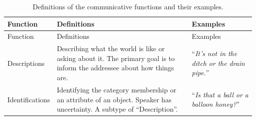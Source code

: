 \documentclass[oneside]{report}
\theoremstyle{definition}
\theoremstyle{definition}
\theoremstyle{definition}
\theoremstyle{remark}
\begin{document}
\begin{longtable}[]{@{}lll@{}}
\caption{\label{tab:speechActs} Definitions of the communicative functions
and their examples.}\tabularnewline
\toprule
\begin{minipage}[b]{0.14\columnwidth}\raggedright\strut
Function\strut
\end{minipage} & \begin{minipage}[b]{0.44\columnwidth}\raggedright\strut
Definitions\strut
\end{minipage} & \begin{minipage}[b]{0.33\columnwidth}\raggedright\strut
Examples\strut
\end{minipage}\tabularnewline
\midrule
\endfirsthead
\toprule
\begin{minipage}[b]{0.14\columnwidth}\raggedright\strut
Function\strut
\end{minipage} & \begin{minipage}[b]{0.44\columnwidth}\raggedright\strut
Definitions\strut
\end{minipage} & \begin{minipage}[b]{0.33\columnwidth}\raggedright\strut
Examples\strut
\end{minipage}\tabularnewline
\midrule
\endhead
\begin{minipage}[t]{0.14\columnwidth}\raggedright\strut
Descriptions\strut
\end{minipage} & \begin{minipage}[t]{0.44\columnwidth}\raggedright\strut
Describing what the world is like or asking about it. The primary goal
is to inform the addressee about how things are.\strut
\end{minipage} & \begin{minipage}[t]{0.33\columnwidth}\raggedright\strut
``\emph{It's not in the ditch or the drain pipe.}''\strut
\end{minipage}\tabularnewline
\begin{minipage}[t]{0.14\columnwidth}\raggedright\strut
Identifications\strut
\end{minipage} & \begin{minipage}[t]{0.44\columnwidth}\raggedright\strut
Identifying the category membership or an attribute of an object.
Speaker has uncertainty. A subtype of ``Description''.\strut
\end{minipage} & \begin{minipage}[t]{0.33\columnwidth}\raggedright\strut
``\emph{Is that a ball or a balloon honey?}''\strut
\end{minipage}\tabularnewline

\end{longtable}
\end{document}
